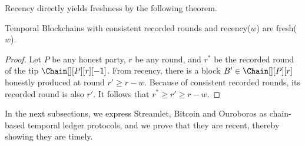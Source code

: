 Recency directly yields freshness by the following theorem.

\begin{theorem}\label{thm.recency-to-freshness}
  Temporal Blockchains with consistent recorded rounds and recency($w$) are fresh($w$).
\end{theorem}
\begin{proof}
  Let $P$ be any honest party, $r$ be any round, and
  $r^*$ be the recorded round of the tip $\Chain[][P][r][-1]$.
  From recency, there is a block $B' \in \Chain[][P][r]$
  honestly produced at round $r' \geq r - w$.
  Because of consistent recorded rounds, its recorded round is also $r'$.
  It follows that $r^* \geq r' \geq r - w$.
  \Qed
\end{proof}

In the next subsections, we express Streamlet, Bitcoin and Ouroboros
as chain-based temporal ledger protocols, and we prove that they are recent,
thereby showing they are timely.

